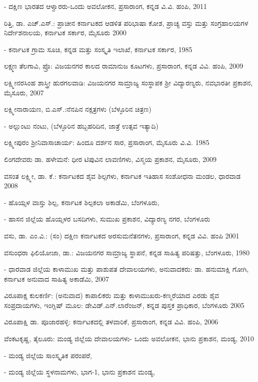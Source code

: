 - ದಕ್ಷಿಣ ಭಾರತದ ಆಳ್ವಾರರು-ಒಂದು ಅವಲೋಕನ, ಪ್ರಸಾರಾಂಗ, ಕನ್ನಡ ವಿ.ವಿ. ಹಂಪಿ, 2011

\noindent
ರಿತ್ತಿ, ಡಾ. ಎಚ್​.ಎಸ್​.: ಪ್ರಾಚೀನ ಕರ್ನಾಟಕದ ಆಡಳಿತ ಪರಿಭಾಷಾ ಕೋಶ, ಪ್ರಾಚ್ಯ ವಸ್ತು ಮತ್ತು ಸಂಗ್ರಹಾಲಯಗಳ ನಿರ್ದೇಶನಾಲಯ, ಕರ್ನಾಟಕ ಸರ್ಕಾರ, ಮೈಸೂರು 2000

- ಕರ್ನಾಟಕ ಗ್ರಾಮ ಸೂಚಿ, ಕನ್ನಡ ಮತ್ತು ಸಂಸ್ಕೃತಿ ಇಲಾಖೆ, ಕರ್ನಾಟಕ ಸರ್ಕಾರ, 1985

\noindent
ಲಕ್ಷ್ಮಣ ತೆಲಗಾವಿ, ಪ್ರೊ: ವಿಜಯನಗರ ಕಾಲದ ರಾಮಾನುಜ ಕೂಟಗಳು, ಪ್ರಸಾರಾಂಗ, ಕನ್ನಡ ವಿವಿ. ಹಂಪಿ, 2009

\noindent
ಲಕ್ಷ್ಮೀನರಸಿಂಹ ಶಾಸ್ತ್ರೀ ಹುರಗಲವಾಡಿ: ವಿಜಯನಗರ ಸಾಮ್ರಾಜ್ಯ ಸಂಸ್ಥಾಪಕ ಶ‍್ರೀ ವಿದ್ಯಾರಣ್ಯರು, ನವಭಾರತೀ ಪ್ರಕಾಶನ, ಮೈಸೂರು, 2007

\noindent
ಲಕ್ಷ್ಮೀನಾರಾಯಣ, ಬಿ.ಎಸ್​.:ನೆನಪಿನ ನಕ್ಷತ್ರಗಳು (ಬೆಳ್ಳೂರಿನ ಚಿತ್ರಣ)

- ಅಲ್ಲುಂಟು ನಂಟು, (ಬೆಳ್ಳೂರಿನ ಹಬ್ಬಹರಿದಿನ, ಜಾತ್ರೆ ಉತ್ಸವ ಇತ್ಯಾದಿ) 

\noindent
ಲಕ್ಷ್ಮೀಪುರಂ ಶ‍್ರೀನಿವಾಸಾಚಾರ್ಯ: ಹಿಂದೂ ದರ್ಶನ ಸಾರ, ಪ್ರಸಾರಾಂಗ, ಮೈಸೂರು ವಿ.ವಿ. 1985

\noindent
ಲಿಂಗದೇವರು ಡಾ. ಹಳೇಮನೆ: ಧೀರ ಟಿಪುವಿನ ಲಾವಣಿಗಳು, ವಿಸ್ಮಯ ಪ್ರಕಾಶನ, ಮೈಸೂರು, 2009

\noindent
ವಸಂತ ಲಕ್ಷ್ಮೀ, ಡಾ. ಕೆ.: ಕರ್ನಾಟಕದ ಶೈವ ಶಿಲ್ಪಗಳು, ಕರ್ನಾಟಕ ಇತಿಹಾಸ ಸಂಶೋಧನಾ ಮಂಡಲ, ಧಾರವಾಡ 2008

- ಹೊಯ್ಸಳ ವಾಸ್ತು ಶಿಲ್ಪ, ಕರ್ನಾಟಕ ಶಿಲ್ಪಕಲಾ ಅಕಾಡೆಮಿ, ಬೆಂಗಳೂರು, 

- ಹಾಸನ ಜಿಲ್ಲೆಯ ಹೊಯ್ಸಳರ ಬಸದಿಗಳು, ಸುಮುಖ ಪ್ರಕಾಶನ, ವಿದ್ಯಾರಣ್ಯ ನಗರ, ಬೆಂಗಳೂರು

\noindent
ವಸು, ಡಾ. ಎಂ.ವಿ.: (ಸಂ) ದಕ್ಷಿಣ ಕರ್ನಾಟಕದ ಅರಸುಮನೆತನಗಳು, ಪ್ರಸಾರಾಂಗ, ಕನ್ನಡ ವಿವಿ. ಹಂಪಿ 2001

\noindent
ವಸುಂಧರಾ ಫಿಲಿಯೋಜಾ, ಡಾ.: ವಿಜಯನಗರ ಸಾಮ್ರಾಜ್ಯ ಸ್ಥಾಪನೆ, ಕನ್ನಡ ಸಾಹಿತ್ಯ ಪರಿಷತ್ತು, ಬೆಂಗಳೂರು, 1980

- ಧಾರವಾಡ ಜಿಲ್ಲೆಯ ಕಾಳಾಮುಖ ಮತ್ತು ಪಾಶುಪತ ದೇವಾಲಯಗಳು, ಅನುವಾದಕರು: ಡಾ. ಹನುಮಾಕ್ಷಿ ಗೋಗಿ, ಕರ್ನಾಟಕ ಅನುವಾದ ಸಾಹಿತ್ಯ ಅಕಾಡೆಮಿ, 2007

\noindent
ವಿರೂಪಾಕ್ಷ ಕುಲಕರ್ಣಿ: (ಅನುವಾದ) ಕಾಪಾಲಿಕರು ಮತ್ತು ಕಾಳಾಮುಖರು-ಕಣ್ಮರೆಯಾದ ಎರಡು ಶೈವ ಸಂಪ್ರದಾಯಗಳು, ಇಂಗ್ಲಿಷ್​ ಮೂಲ: ಡೇವಿಡ್​.ಎನ್​.ಲಾರೆಂಜನ್​, ಕನ್ನಡ ಪುಸ್ತಕ ಪ್ರಾಧಿಕಾರ, ಬೆಂಗಳೂರು 2005

\noindent
ವಿರೂಪಾಕ್ಷಿ ಡಾ. ಪೂಜಾರಹಳ್ಳಿ: ಕರ್ನಾಟಕದಲ್ಲಿ ತಳವಾರಿಕೆ, ಪ್ರಸಾರಾಂಗ, ಕನ್ನಡ ವಿವಿ. ಹಂಪಿ, 2006

\noindent
ವೆಂಕಟಕೃಷ್ಣ, ತೈಲೂರು: ಮಂಡ್ಯ ಜಿಲ್ಲೆಯ ದೇವಾಲಯಗಳು- ಒಂದು ಅವಲೋಕನ, ಭಾನು ಪ್ರಕಾಶನ, ಮಂಡ್ಯ, 2010

- ಮಂಡ್ಯ ಜಿಲ್ಲೆಯ ಸಾಂಸ್ಕೃತಿಕ ಪರಂಪರೆ,

- ಮಂಡ್ಯ ಜಿಲ್ಲೆಯ ಸ್ಥಳನಾಮಗಳು, ಭಾಗ-1, ಭಾನು ಪ್ರಕಾಶನ ಮಂಡ್ಯ,

